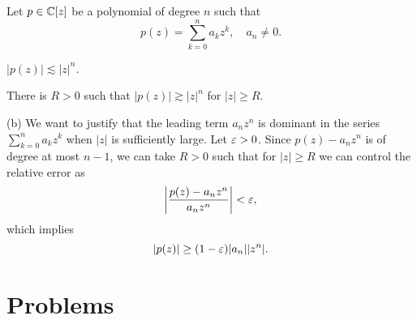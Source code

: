 \documentclass{../../large}
\begin{document}
\begin{prb}
Let $p\in\mathbb{C}[z]$ be a polynomial of degree $n$ such that
\[p(z)=\sum_{k=0}^na_kz^k,\quad a_n\ne0.\]
\begin{parts}
\item $|p(z)|\lesssim|z|^n$.
\item There is $R>0$ such that $|p(z)|\gtrsim|z|^n$ for $|z|\ge R$.
\end{parts}
\end{prb}
\begin{pf}
(b)
We want to justify that the leading term $a_nz^n$ is dominant in the series $\sum_{k=0}^na_kz^k$ when $|z|$ is sufficiently large.
Let $\varepsilon>0$.
Since $p(z)-a_nz^n$ is of degree at most $n-1$, we can take $R>0$ such that for $|z|\ge R$ we can control the relative error as
\[\left|\frac{p(z)-a_nz^n}{a_nz^n}\right|<\varepsilon,\]
which implies
\[|p(z)|\ge(1-\varepsilon)|a_n||z^n|.\]
\end{pf}


\section*{Problems}
\end{document}
